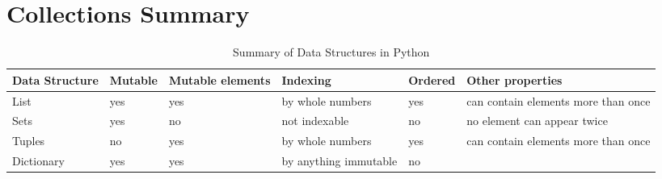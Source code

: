\documentclass[11pt]{cselabheader}
\begin{document}
%
%
%
%

\pagebreak
\section{Collections Summary}

\begin{table}[!ht]
  \centering
  \begin{tabular}{p{1.6cm}lp{1.6cm}p{3cm}lp{5cm}}
    \toprule
    Data Structure & Mutable & Mutable elements & Indexing & Ordered
    & Other
    properties\\
    \midrule
    List & yes & yes & by whole numbers & yes & can contain elements more than once\\
    Sets & yes & no & not indexable & no & no element can appear twice\\
    Tuples & no & yes & by whole numbers & yes & can contain elements more than
    once\\
    Dictionary & yes & yes & by anything immutable & no & \\
    \bottomrule
  \end{tabular}
  \caption{Summary of Data Structures in Python}
  \label{tab:sum}
\end{table}
\end{document}
